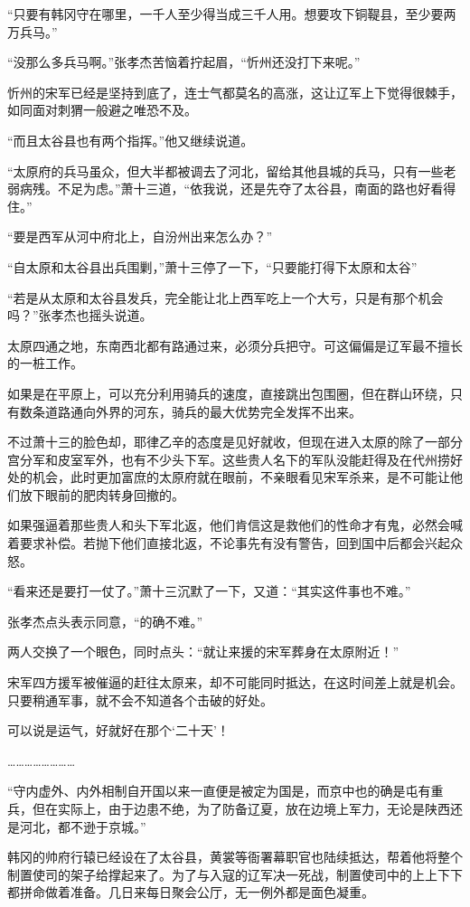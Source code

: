 “只要有韩冈守在哪里，一千人至少得当成三千人用。想要攻下铜鞮县，至少要两万兵马。”

“没那么多兵马啊。”张孝杰苦恼着拧起眉，“忻州还没打下来呢。”

忻州的宋军已经是坚持到底了，连士气都莫名的高涨，这让辽军上下觉得很棘手，如同面对刺猬一般避之唯恐不及。

“而且太谷县也有两个指挥。”他又继续说道。

“太原府的兵马虽众，但大半都被调去了河北，留给其他县城的兵马，只有一些老弱病残。不足为虑。”萧十三道，“依我说，还是先夺了太谷县，南面的路也好看得住。”

“要是西军从河中府北上，自汾州出来怎么办？”

“自太原和太谷县出兵围剿，”萧十三停了一下，“只要能打得下太原和太谷”

“若是从太原和太谷县发兵，完全能让北上西军吃上一个大亏，只是有那个机会吗？”张孝杰也摇头说道。

太原四通之地，东南西北都有路通过来，必须分兵把守。可这偏偏是辽军最不擅长的一桩工作。

如果是在平原上，可以充分利用骑兵的速度，直接跳出包围圈，但在群山环绕，只有数条道路通向外界的河东，骑兵的最大优势完全发挥不出来。

不过萧十三的脸色却，耶律乙辛的态度是见好就收，但现在进入太原的除了一部分宫分军和皮室军外，也有不少头下军。这些贵人名下的军队没能赶得及在代州捞好处的机会，此时更加富庶的太原府就在眼前，不亲眼看见宋军杀来，是不可能让他们放下眼前的肥肉转身回撤的。

如果强逼着那些贵人和头下军北返，他们肯信这是救他们的性命才有鬼，必然会喊着要求补偿。若抛下他们直接北返，不论事先有没有警告，回到国中后都会兴起众怒。

“看来还是要打一仗了。”萧十三沉默了一下，又道：“其实这件事也不难。”

张孝杰点头表示同意，“的确不难。”

两人交换了一个眼色，同时点头：“就让来援的宋军葬身在太原附近！”

宋军四方援军被催逼的赶往太原来，却不可能同时抵达，在这时间差上就是机会。只要稍通军事，就不会不知道各个击破的好处。

可以说是运气，好就好在那个‘二十天’！

……………………

“守内虚外、内外相制自开国以来一直便是被定为国是，而京中也的确是屯有重兵，但在实际上，由于边患不绝，为了防备辽夏，放在边境上军力，无论是陕西还是河北，都不逊于京城。”

韩冈的帅府行辕已经设在了太谷县，黄裳等衙署幕职官也陆续抵达，帮着他将整个制置使司的架子给撑起来了。为了与入寇的辽军决一死战，制置使司中的上上下下都拼命做着准备。几日来每日聚会公厅，无一例外都是面色凝重。

